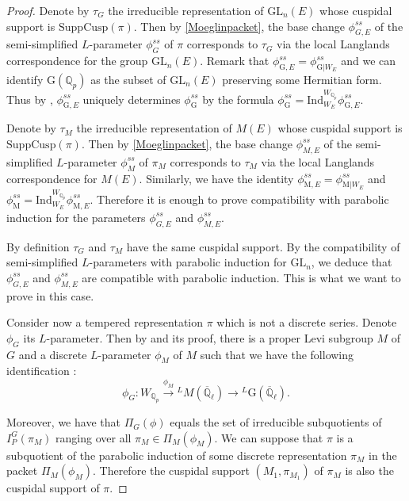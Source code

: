\documentclass[reqno,11pt]{amsart}
\theoremstyle{remark}
\newcommand{\G}{\mathrm{G}}
\newcommand{\GL}{\mathrm{GL}}
\newcommand{\Q}{\mathbb{Q}}
\newcommand{\ov}{\overline}
\newcommand{\M}{\mathrm{M}}
\newcommand{\Ind}{\mathrm{Ind}}
\newcommand{\SuppCusp}{\mathrm{SuppCusp}}
\begin{document}
\begin{proof}
Denote by $\tau_G$ the irreducible representation of $\GL_n(E)$ whose cuspidal support is $\SuppCusp (\pi)$. Then by \ref{Moeglinpacket}, the base change $ \phi_{G, E}^{ss} $ of the semi-simplified $L$-parameter $ \phi_G^{ss} $ of $\pi$ corresponds to $\tau_G$ via the local Langlands correspondence for the group $\GL_n(E)$. Remark that $\phi_{\G, E}^{ss} = \phi_{\G | W_E }^{ss} $ and we can identify $\G(\Q_p)$ as the subset of $\GL_n(E)$ preserving some Hermitian form. Thus by \cite[Theorem~8.1 (ii)]{GGP}, $\phi_{\G, E}^{ss}$ uniquely determines $\phi_{\G}^{ss}$ by the formula $ \phi_{\G}^{ss} = \Ind_{W_E}^{W_{\Q_p}} \phi_{\G, E}^{ss} $. 

Denote by $\tau_M$ the irreducible representation of $M(E)$ whose cuspidal support is $\SuppCusp (\pi)$. Then by \ref{Moeglinpacket}, the base change $\phi_{M, E}^{ss}$ of the semi-simplified $L$-parameter $ \phi_M^{ss} $ of $ \pi_M $ corresponds to $\tau_M$ via the local Langlands correspondence for $M(E)$. Similarly, we have the identity $\phi_{\M, E}^{ss} = \phi_{\M | W_E }^{ss} $ and $ \phi_{\M}^{ss} = \Ind_{W_E}^{W_{\Q_p}} \phi_{\M, E}^{ss} $. Therefore it is enough to prove compatibility with parabolic induction for the parameters $\phi_{G, E}^{ss}$ and $\phi_{M, E}^{ss}$.

 
 By definition $\tau_G$ and $\tau_M$ have the same cuspidal support. By the compatibility of semi-simplified $L$-parameters with parabolic induction for $\GL_n$, we deduce that $ \phi_{G, E}^{ss} $ and $ \phi_{M, E}^{ss} $ are compatible with parabolic induction. This is what we want to prove in this case. 

Consider now a tempered representation $\pi$ which is not a discrete series. Denote $\phi_G$ its $L$-parameter. Then by  \cite[Proposition~3.4.4]{Mok} and its proof, there is a proper Levi subgroup $M$ of $G$ and a discrete $L$-parameter $\phi_M$ of $M$ such that we have the following identification : 
\begin{equation} \label{*}
 \phi_G : W_{\Q_p} \xrightarrow{ \phi_M } \phantom{}^{L}M(\ov{\Q}_{\ell}) \rightarrow \phantom{}^{L}\G(\ov{\Q}_{\ell}).   
\end{equation}

Moreover, we have that $\Pi_G(\phi)$ equals the set of irreducible subquotients of $I^G_P(\pi_M)$ ranging over all $\pi_M \in \Pi_M(\phi_M)$. We can suppose that $\pi$ is a subquotient of the parabolic induction of some discrete representation $\pi_M$ in the packet $\Pi_M(\phi_M)$. Therefore the cuspidal support $ ( M_1, \pi_{M_1}) $ of $\pi_M$ is also the cuspidal support of $\pi$.


\end{proof}
\end{document}
